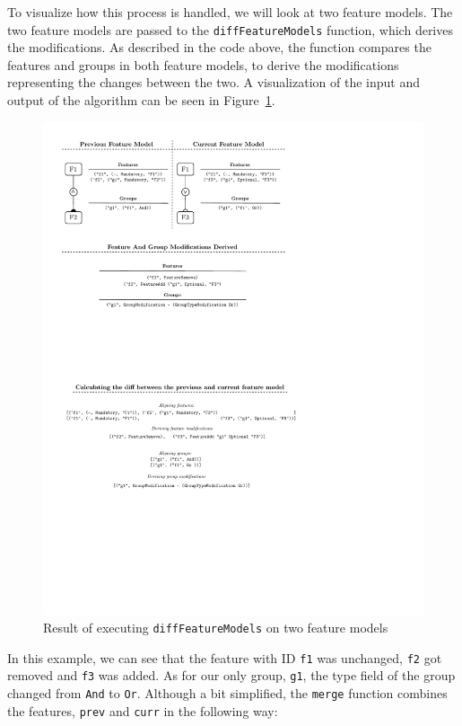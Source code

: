 \documentclass[a4paper,english]{ifimaster}
\begin{document}
To visualize how this process is handled, we will look at two feature models. The two feature models are passed to the \texttt{diff\-Feature\-Models} function, which derives the modifications. As described in the code above, the function compares the features and groups in both feature models, to derive the modifications representing the changes between the two. A visualization of the input and output of the algorithm can be seen in Figure~\ref{fig:diff_feature_models_visualized}.

\begin{figure}[htpb]
  \centering
  \includegraphics[]{feature_model_diff_visualized.pdf}
  \caption{Result of executing \texttt{diffFeatureModels} on two feature models}%
  \label{fig:diff_feature_models_visualized}
\end{figure}

In this example, we can see that the feature with ID \texttt{f1} was unchanged, \texttt{f2} got removed and \texttt{f3} was added. As for our only group, \texttt{g1}, the type field of the group changed from \texttt{And} to \texttt{Or}. Although a bit simplified, the \texttt{merge} function combines the features, \texttt{prev} and \texttt{curr} in the following way:
\end{document}
